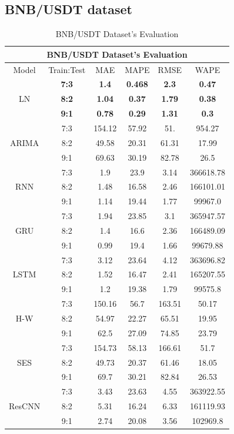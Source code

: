 \documentclass{ieeeojies}
\begin{document}
\subsection{BNB/USDT dataset}
\begin{table}[H]
    \centering
    \begin{tabular}{|c|c|c|c|c|c|}
         \hline
         \multicolumn{6}{|c|}{\textbf{BNB/USDT Dataset's Evaluation}}\\
         \hline
         \centering Model & Train:Test & MAE & MAPE & RMSE & WAPE \\ 
         \hline
         \multirow{3}{*}{LN} & \textbf{7:3} & \textbf{1.4} & \textbf{0.468} & \textbf{2.3} & \textbf{0.47} \\ & \textbf{8:2} & \textbf{1.04} & \textbf{0.37} & \textbf{1.79} & \textbf{0.38} \\ & \textbf{9:1} & \textbf{0.78} & \textbf{0.29} & \textbf{1.31} & \textbf{0.3} \\ 
         \hline
         \multirow{3}{*}{ARIMA} & 7:3 & 154.12 & 57.92 & 51. & 954.27 \\ & 8:2 & 49.58 & 20.31 & 61.31 & 17.99 \\ & 9:1 & 69.63 & 30.19 & 82.78 & 26.5 \\
         \hline
         \multirow{3}{*}{RNN} & 7:3 & 1.9 & 23.9 & 3.14 & 366618.78 \\ & 8:2 & 1.48 & 16.58 & 2.46 & 166101.01 \\ & 9:1 & 1.14 & 19.44 & 1.77 & 99967.0 \\
         \hline
         \multirow{3}{*}{GRU} & 7:3 & 1.94 & 23.85 & 3.1 & 365947.57 \\ & 8:2 & 1.4 & 16.6 & 2.36 & 166489.09 \\ & 9:1 & 0.99 & 19.4 & 1.66 & 99679.88 \\
         \hline
         \multirow{3}{*}{LSTM} & 7:3 & 3.12 & 23.64 & 4.12 & 363696.82 \\ & 8:2 & 1.52 & 16.47 & 2.41 & 165207.55 \\ & 9:1 & 1.2 & 19.38 & 1.79 & 99575.8 \\
         \hline
         \multirow{3}{*}{H-W} & 7:3 & 150.16 & 56.7 & 163.51 & 50.17 \\ & 8:2 & 54.97 & 22.27 & 65.51 & 19.95 \\ & 9:1 & 62.5 & 27.09 & 74.85 & 23.79 \\
         \hline
         \multirow{3}{*}{SES} & 7:3 & 154.73 & 58.13 & 166.61 & 51.7 \\ & 8:2 & 49.73 & 20.37 & 61.46 & 18.05 \\ & 9:1 & 69.7 & 30.21 & 82.84 & 26.53 \\
         \hline
         \multirow{3}{*}{ResCNN} & 7:3 & 3.43 & 23.63 & 4.55 & 363922.55 \\ & 8:2 & 5.31 & 16.24 & 6.33 & 161119.93 \\ & 9:1 & 2.74 & 20.08 & 3.56 & 102969.8 \\
         \hline
    \end{tabular}
    \caption{BNB/USDT Dataset's Evaluation}
    \label{bnbresult}
\end{table}
\end{document}
